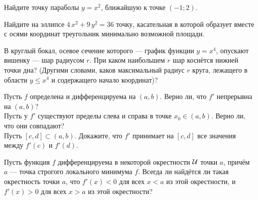\documentclass[a4paper,11pt]{article}
\begin{document}
Найдите точку параболы $y=x^2$, ближайшую к точке $(-1;2)$.

Найдите на эллипсе $4\,x^2+9\,y^2=36$ точку, касательная в которой
образует вместе с осями координат треугольник минимально возможной площади.

 В круглый бокал, осевое сечение которого --- график
функции $y=x^4$, опускают вишенку --- шар радиусом $r$.
При каком наибольшем $r$ шар косн\"ется нижней точки дна?
(Другими словами, каков максимальный радиус $r$ круга, лежащего в
области $y\leq x^4$ и содержащего начало координат)?




 Пусть %
$f$ определена и дифференцируема
на $(a,b)$.
 Верно ли, что $f'$ непрерывна на $(a,b)$?\\
 Пусть у $f'$ существуют пределы слева и справа в точке $x_0\in(a,b)$.
Верно ли, что %
они совпадают?\\
%
Пусть $[c,d]\subset(a,b)$.
Докажите, что $f'$  принимает на $[c,d]$ все значения между
$f'(c)$ и $f'(d)$.

Пусть функция $f$ дифференцируема в некоторой окрестности $\cal U$
точки $a$, прич\"ем
%
$a$ --- точка строгого локального минимума $f$. Всегда ли
найд\"ется ли такая окрестность точки $a$, что $f'(x)<0$ для всех $x<a$
из этой окрестности, и $f'(x)>0$ для всех $x>a$ из этой окрестности?




\end{document}

